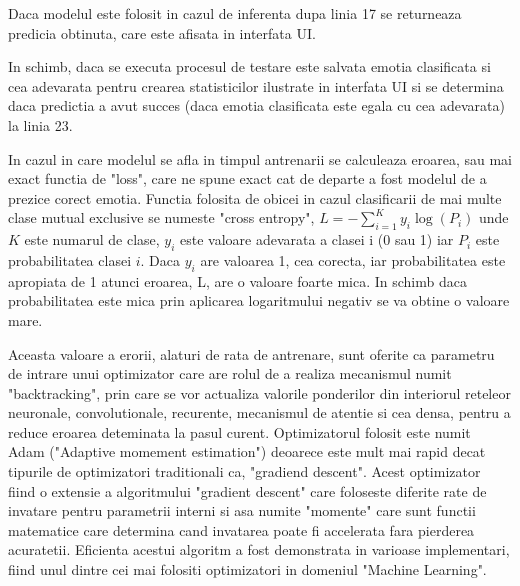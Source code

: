 \documentclass[a4paper,12pt]{book}
\begin{document}
		Daca modelul este folosit in cazul de inferenta dupa linia 17 se returneaza predicia obtinuta, care este afisata in interfata UI. \par
		In schimb, daca se executa procesul de testare este salvata emotia clasificata si cea adevarata pentru crearea statisticilor ilustrate in interfata UI si se determina daca predictia a avut succes (daca emotia clasificata este egala cu cea adevarata) la linia 23. \par
		In cazul in care modelul se afla in timpul antrenarii se calculeaza eroarea, sau mai exact functia de "loss", care ne spune exact cat de departe a fost modelul de a prezice corect emotia. Functia folosita de obicei in cazul clasificarii de mai multe clase mutual exclusive se numeste "cross entropy", $L = -\sum_{i=1}^{K} y_i \log(P_i)$ unde $K$ este numarul de clase, $y_i$ este valoare adevarata a clasei i (0 sau 1) iar $P_i$ este probabilitatea clasei $i$. Daca $y_i$ are valoarea 1, cea corecta, iar probabilitatea este apropiata de 1 atunci eroarea, L, are o valoare foarte mica. In schimb daca probabilitatea este mica prin aplicarea logaritmului negativ se va obtine o valoare mare. \par
		Aceasta valoare a erorii, alaturi de rata de antrenare, sunt oferite ca parametru de intrare unui optimizator care are rolul de a realiza mecanismul numit "backtracking", prin care se vor actualiza valorile ponderilor din interiorul reteleor neuronale, convolutionale, recurente, mecanismul de atentie si cea densa, pentru a reduce eroarea deteminata la pasul curent. Optimizatorul folosit este numit Adam \cite{adam} ("Adaptive momement estimation") deoarece este mult mai rapid decat tipurile de optimizatori traditionali ca, "gradiend descent". Acest optimizator fiind o extensie a algoritmului "gradient descent"	care foloseste diferite rate de invatare pentru parametrii interni si asa numite "momente" care sunt functii matematice care determina cand invatarea poate fi accelerata fara pierderea acuratetii. Eficienta acestui algoritm a fost demonstrata in varioase implementari, fiind unul dintre cei mai folositi optimizatori in domeniul "Machine Learning".
\end{document}
